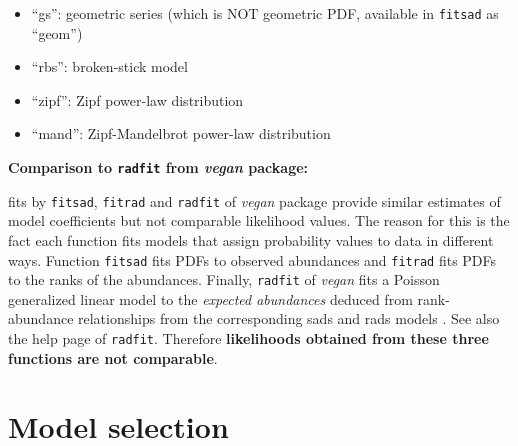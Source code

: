\documentclass[11pt, A4]{article}
\newcommand{\code}[1]{\texttt{#1}}
\begin{document}
\begin{itemize}
\item ``gs'': geometric series (which is NOT geometric PDF, available
  in \code{fitsad} as ``geom'')
\item ``rbs'': broken-stick model \citep{macarthur1957, May1975}
\item ``zipf'': Zipf power-law distribution
\item ``mand'': Zipf-Mandelbrot power-law distribution
\end{itemize}

\begin{shaded}
  \textbf{Comparison to \code{radfit} from \emph{vegan} package:} \hfill
  
  fits by \code{fitsad}, \code{fitrad} and \code{radfit} of \emph{vegan} 
  package provide similar estimates of model coefficients 
  but not comparable likelihood values. The reason for this is the fact each function fits models that assign 
  probability values to data in different ways. Function \code{fitsad} fits PDFs to observed abundances and \code{fitrad} fits PDFs 
  to the ranks of the abundances. Finally, \code{radfit} of \emph{vegan} fits a Poisson generalized linear model 
  to the \emph{expected abundances} deduced 
  from rank-abundance relationships from the corresponding sads and rads models \citep{wilson1991}. 
  See also the help page of \code{radfit}. 
  Therefore \textbf{likelihoods obtained from these three functions are not comparable}.
\end{shaded}

\section{Model selection}
\end{document}
